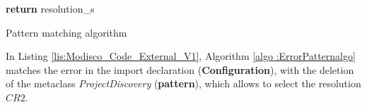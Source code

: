 \begin{algorithm2e}[H]
{{{{{						}
					}
				}
				
				
			} 
			
			
		}
		\textbf{return} resolution\_s
		
		
		\caption{Pattern matching algorithm}
		\label{algo :ErrorPatternalgo}
	\end{algorithm2e}

In Listing \ref{lis:Modisco_Code_External_V1}, Algorithm \ref{algo :ErrorPatternalgo} matches the error in the import declaration (\textbf{Configuration}), with the deletion of the metaclass \textit{ProjectDiscovery} (\textbf{pattern}), which allows to select the resolution $CR2$.










